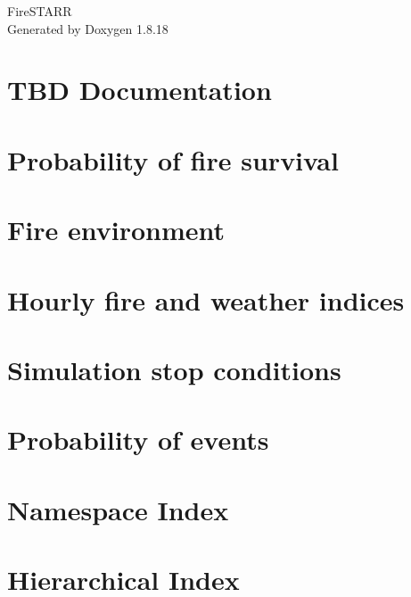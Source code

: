 \let\mypdfximage\pdfximage\def\pdfximage{\immediate\mypdfximage}\documentclass[twoside]{book}
\newcommand{\+}{\discretionary{\mbox{\scriptsize$\hookleftarrow$}}{}{}}
\newcommand{\clearemptydoublepage}{%
  \newpage{\pagestyle{empty}\cleardoublepage}%
}
\begin{document}
\hypersetup{pageanchor=false,
             bookmarksnumbered=true,
             pdfencoding=unicode
            }
\begin{titlepage}
\vspace*{7cm}
\begin{center}%
{\Large Fire\+S\+T\+A\+RR }\\
\vspace*{1cm}
{\large Generated by Doxygen 1.8.18}\\
\end{center}
\end{titlepage}
\clearemptydoublepage
{}
\tableofcontents
\clearemptydoublepage
{}
\hypersetup{pageanchor=true}

\chapter{T\+BD Documentation}
\label{index}\hypertarget{index}{}
\chapter{Probability of fire survival}
\label{survival}

\chapter{Fire environment}
\label{environment}

\chapter{Hourly fire and weather indices}
\label{weather}

\chapter{Simulation stop conditions}
\label{ending}

\chapter{Probability of events}
\label{probability}

\chapter{Namespace Index}

\chapter{Hierarchical Index}

\end{document}
